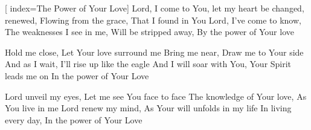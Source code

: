 [
index={The Power of Your Love}]
\beginverse	
Lord, I come to You, let my heart be changed, renewed,
Flowing from the grace, 
That I found in You
Lord, I've come to know,
 The weaknesses I see in me,
Will be stripped away, 
By the power of Your love
\endverse

\beginchorus
Hold me close, 
Let Your love surround me
Bring me near, Draw me to Your side
And as I wait, I'll rise up like the eagle
And I will soar with You, 
Your Spirit leads me on
In the power of Your Love
\endchorus

\beginverse
\chordsoff
Lord unveil my eyes,
 Let me see You face to face
The knowledge of Your love, 
As You live in me
Lord renew my mind,
 As Your will unfolds in my life
In living every day, 
In the power of Your Love 
\chordson
\endverse


\endsong
